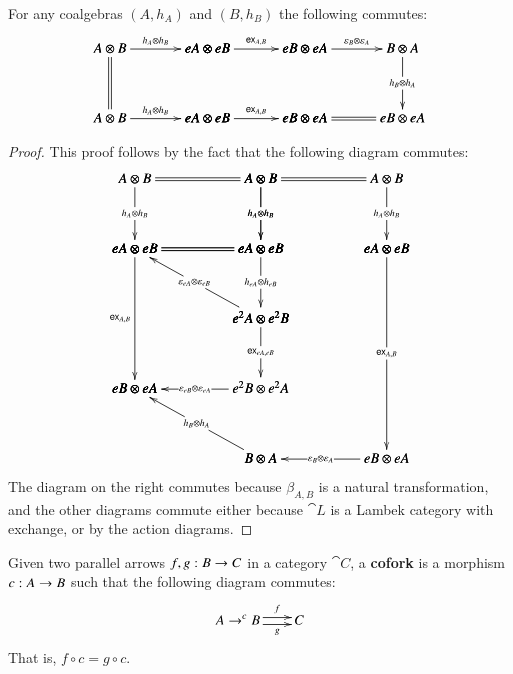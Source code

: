 \begin{corollary}
  \label{corollary:ex-simple}
  For any coalgebras $(A,h_A)$ and $(B,h_B)$ the following commutes:
    \[
    \bfig
    \square|aaaa|/->`=``->/<700,500>[
      A \otimes B`
      eA \otimes eB`
      A \otimes B`
      eA \otimes eB;
      h_A \otimes h_B```
      h_A \otimes h_B]

    \square(700,0)|aaaa|/->```->/<700,500>[
      eA \otimes eB`
      eB \otimes eA`
      eA \otimes eB`
      eB \otimes eA;
      \e{A,B}```
      \e{A,B}]

    \square(1400,0)|aama|/->``->`=/<700,500>[
      eB \otimes eA`
      B \otimes A`
      eB \otimes eA`
      eB \otimes eA;
      \varepsilon_B \otimes \varepsilon_A``
      h_B \otimes h_A`]
      \efig
    \]
\end{corollary}
\begin{proof}
  This proof follows by the fact that the following diagram commutes:
  \[
  \bfig
  \square|mmmm|/=`->`->`=/<900,500>[
    A \otimes B`
    A \otimes B`
    eA \otimes eB`
    eA \otimes eB;`
    h_A \otimes h_B`
    h_A \otimes h_B`]

  \qtriangle(0,-500)|mmm|/=`<-`->/<900,500>[
    eA \otimes eB`
    eA \otimes eB`
    e^2A \otimes e^2B;`
    \varepsilon_{eA} \otimes \varepsilon_{eB}`
    h_{eA} \otimes h_{eB}]

  \dtriangle(0,-1000)|mmm|/`->`<-/<900,500>[
    e^2A \otimes e^2B`
    eB \otimes eA`
    e^2B \otimes e^2A;`
    \e{eA,eB}`
    \varepsilon_{eB} \otimes \varepsilon_{eA}]

  \morphism(0,0)<0,-1000>[eA \otimes eB`eB \otimes eA;\e{A,B}]

  \square(900,0)|mmmm|/=`->`->`/<900,500>[
    A \otimes B`
    A \otimes B`
    eA \otimes eB`
    eA \otimes eB;`
    h_A \otimes h_B`
    h_A \otimes h_B`]

  \dtriangle(900,-1500)|mmm|/`->`<-/<900,1500>[
    eA \otimes eB`
    B \otimes A`
    eB \otimes eA;`
    \e{A,B}`
    \varepsilon_{B} \otimes \varepsilon_A]

  \morphism(900,-1500)|m|<-900,500>[B \otimes A`eB \otimes eA;h_B \otimes h_A]
  \efig
  \]
  The diagram on the right commutes because $\beta_{A,B}$ is a natural
  transformation, and the other diagrams commute either because
  $\cat{L}$ is a Lambek category with exchange, or by the action
  diagrams.
\end{proof}

\begin{definition}
  \label{def:cofork}
  Given two parallel arrows $f,g : B \rightarrow C$ in a category $\cat{C}$,
  a \textbf{cofork} is a morphism $c : A \rightarrow B$ such that
  the following diagram commutes:
  \[
  A \mto^c B \two^f_g C
  \]
  That is, $f \circ c = g \circ c$.
\end{definition}

